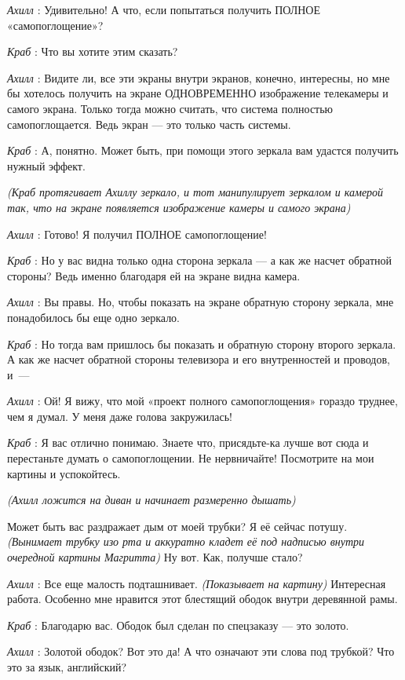 \documentclass[../main.tex]{subfiles}
\begin{document}
\begin{dialogue}
\emph{Ахилл} : Удивительно! А что, если попытаться получить ПОЛНОЕ «самопоглощение»?

\emph{Краб} : Что вы хотите этим сказать?

\emph{Ахилл} : Видите ли, все эти экраны внутри экранов, конечно, интересны, но мне бы хотелось получить на экране ОДНОВРЕМЕННО изображение телекамеры и самого экрана. Только тогда можно считать, что система полностью самопоглощается. Ведь экран --- это только часть системы.

\emph{Краб} : А, понятно. Может быть, при помощи этого зеркала вам удастся получить нужный эффект.

\emph{(Краб протягивает Ахиллу зеркало, и тот манипулирует зеркалом и камерой так, что на экране появляется изображение камеры и самого экрана)}

\emph{Ахилл} : Готово! Я получил ПОЛНОЕ самопоглощение!

\emph{Краб} : Но у вас видна только одна сторона зеркала --- а как же насчет обратной стороны? Ведь именно благодаря ей на экране видна камера.

\emph{Ахилл} : Вы правы. Но, чтобы показать на экране обратную сторону зеркала, мне понадобилось бы еще одно зеркало.

\emph{Краб} : Но тогда вам пришлось бы показать и обратную сторону второго зеркала. А как же насчет обратной стороны телевизора и его внутренностей и проводов, и~---

\emph{Ахилл} : Ой! Я вижу, что мой «проект полного самопоглощения» гораздо труднее, чем я думал. У меня даже голова закружилась!

\emph{Краб} : Я вас отлично понимаю. Знаете что, присядьте-ка лучше вот сюда и перестаньте думать о самопоглощении. Не нервничайте! Посмотрите на мои картины и успокойтесь.

\emph{(Ахилл ложится на диван и начинает размеренно дышать)}

Может быть вас раздражает дым от моей трубки? Я её сейчас потушу. \emph{(Вынимает трубку изо рта и аккуратно кладет её под надписью внутри очередной картины Магритта)} Ну вот. Как, получше стало?

\emph{Ахилл} : Все еще малость подташнивает. \emph{(Показывает на картину)} Интересная работа. Особенно мне нравится этот блестящий ободок внутри деревянной рамы.

\emph{Краб} : Благодарю вас. Ободок был сделан по спецзаказу --- это золото.

\emph{Ахилл} : Золотой ободок? Вот это да! А что означают эти слова под трубкой? Что это за язык, английский?


\end{dialogue}
\end{document}
